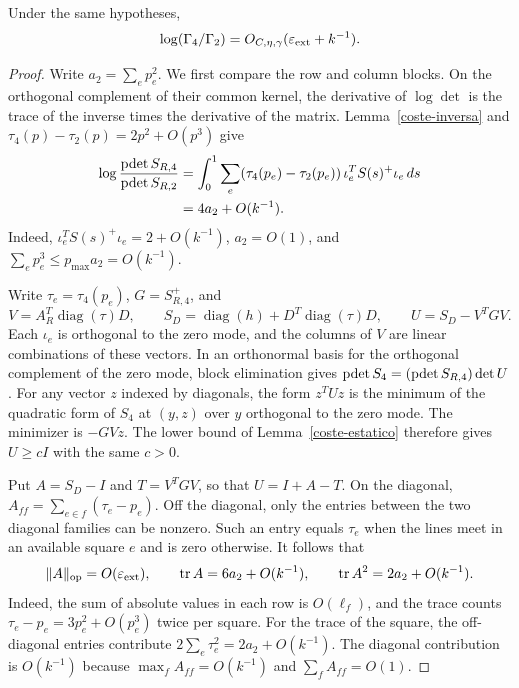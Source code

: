 \begin{proposicion}\label{coste-normalizadores}
Under the same hypotheses,
\[
 \log(\Gamma_4/\Gamma_2)=O_{C,\eta,\gamma}(\varepsilon_{\rm ext}+k^{-1}).
\]
\end{proposicion}
\begin{proof}
Write $a_2=\sum_e p_e^2$. We first compare the row and column blocks. On the orthogonal complement
of their common kernel, the derivative of $\log\det$ is the trace of the inverse times the
derivative of the matrix. Lemma~\ref{coste-inversa} and $\tau_4(p)-\tau_2(p)=2p^2+O(p^3)$ give
\[
 \begin{split}
 \log\frac{\operatorname{pdet} S_{R,4}}{\operatorname{pdet} S_{R,2}}
 &=\int_0^1\sum_e(\tau_4(p_e)-\tau_2(p_e))\,
                   \iota_e^TS(s)^+\iota_e\,ds\\
 &=4a_2+O(k^{-1}).
 \end{split}
\]
Indeed, $\iota_e^TS(s)^+\iota_e=2+O(k^{-1})$, $a_2=O(1)$, and
$\sum_e p_e^3\le p_{\max}a_2=O(k^{-1})$.

Write $\tau_e=\tau_4(p_e)$, $G=S_{R,4}^+$, and
\[
 V=A_R^T\operatorname{diag}(\tau)D,\qquad
 S_D=\operatorname{diag}(h)+D^T\operatorname{diag}(\tau)D,\qquad
 U=S_D-V^TGV .
\]
Each $\iota_e$ is orthogonal to the zero mode, and the columns of $V$ are linear combinations of
these vectors. In an orthonormal basis for the orthogonal complement of the zero mode, block
elimination gives $\operatorname{pdet} S_4=(\operatorname{pdet} S_{R,4})\det U$. For any vector $z$ indexed by diagonals,
the form $z^TU z$ is the minimum of the quadratic form of $S_4$ at $(y,z)$ over $y$ orthogonal
to the zero mode. The minimizer is $-GVz$. The lower bound of Lemma~\ref{coste-estatico}
therefore gives $U\ge cI$ with the same $c>0$.

Put $A=S_D-I$ and $T=V^TGV$, so that $U=I+A-T$. On the diagonal,
$A_{ff}=\sum_{e\in f}(\tau_e-p_e)$. Off the diagonal, only the entries between the two diagonal
families can be nonzero. Such an entry equals $\tau_e$ when the lines meet in an available square
$e$ and is zero otherwise. It follows that
\[
 \|A\|_{\rm op}=O(\varepsilon_{\rm ext}),\qquad
 \operatorname{tr}A=6a_2+O(k^{-1}),\qquad
 \operatorname{tr}A^2=2a_2+O(k^{-1}).
\]
Indeed, the sum of absolute values in each row is $O(\ell_f)$, and the trace counts
$\tau_e-p_e=3p_e^2+O(p_e^3)$ twice per square. For the trace of the square, the off-diagonal
entries contribute $2\sum_e\tau_e^2=2a_2+O(k^{-1})$. The diagonal contribution is $O(k^{-1})$
because $\max_f A_{ff}=O(k^{-1})$ and $\sum_f A_{ff}=O(1)$.


\end{proof}
